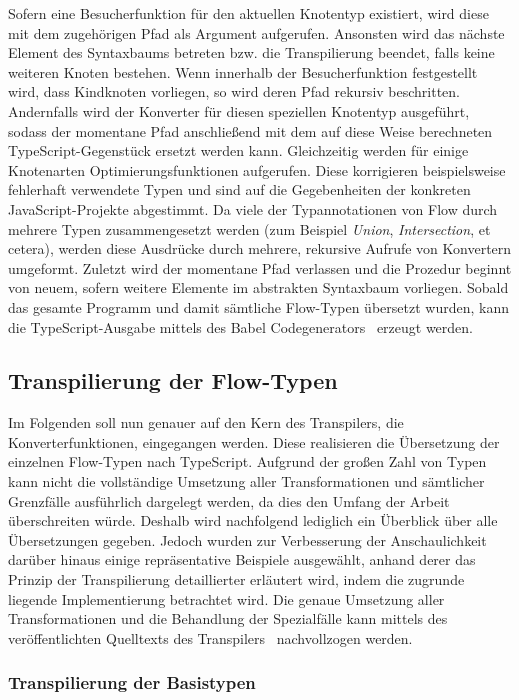 Sofern eine Besucherfunktion für den aktuellen Knotentyp existiert, wird diese mit dem zugehörigen Pfad als Argument aufgerufen. Ansonsten wird das nächste Element des Syntaxbaums betreten bzw. die Transpilierung beendet, falls keine weiteren Knoten bestehen. Wenn innerhalb der Besucherfunktion festgestellt wird, dass Kindknoten vorliegen, so wird deren Pfad rekursiv beschritten. Andernfalls wird der Konverter für diesen speziellen Knotentyp ausgeführt, sodass der momentane Pfad anschließend mit dem auf diese Weise berechneten TypeScript-Gegenstück ersetzt werden kann. Gleichzeitig werden für einige Knotenarten Optimierungsfunktionen aufgerufen. Diese korrigieren beispielsweise fehlerhaft verwendete Typen und sind auf die Gegebenheiten der konkreten JavaScript-Projekte abgestimmt. Da viele der Typannotationen von Flow durch mehrere Typen zusammengesetzt werden (zum Beispiel \textit{Union}, \textit{Intersection}, et cetera), werden diese Ausdrücke durch mehrere, rekursive Aufrufe von Konvertern umgeformt. Zuletzt wird der momentane Pfad verlassen und die Prozedur beginnt von neuem, sofern weitere Elemente im abstrakten Syntaxbaum vorliegen. Sobald das gesamte Programm und damit sämtliche Flow-Typen übersetzt wurden, kann die TypeScript-Ausgabe mittels des Babel Codegenerators~\autocite{BABEL:GENERATOR} erzeugt werden.

\subsection{Transpilierung der Flow-Typen}
\label{sec:flow-transpilation}

Im Folgenden soll nun genauer auf den Kern des Transpilers, die Konverterfunktionen, eingegangen werden. Diese realisieren die Übersetzung der einzelnen Flow-Typen nach TypeScript. Aufgrund der großen Zahl von Typen kann nicht die vollständige Umsetzung aller Transformationen und sämtlicher Grenzfälle ausführlich dargelegt werden, da dies den Umfang der Arbeit überschreiten würde. Deshalb wird nachfolgend lediglich ein Überblick über alle Übersetzungen gegeben. Jedoch wurden zur Verbesserung der Anschaulichkeit darüber hinaus einige repräsentative Beispiele ausgewählt, anhand derer das Prinzip der Transpilierung detaillierter erläutert wird, indem die zugrunde liegende Implementierung betrachtet wird. Die genaue Umsetzung aller Transformationen und die Behandlung der Spezialfälle kann mittels des veröffentlichten Quelltexts des Transpilers~\autocite{REFLOW_GITHUB} nachvollzogen werden.

\subsubsection{Transpilierung der Basistypen}

